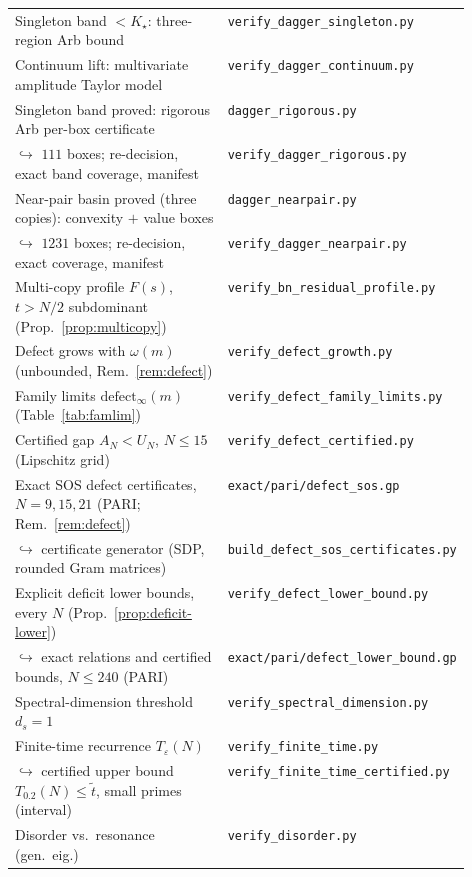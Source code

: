 \begin{longtable}{@{}p{0.53\linewidth}@{\hspace{0.6em}}l@{}}
Singleton band $<K_\star$: three-region Arb bound & \texttt{verify\_dagger\_singleton.py}\\
Continuum lift: multivariate amplitude Taylor model & \texttt{verify\_dagger\_continuum.py}\\
Singleton band proved: rigorous Arb per-box certificate & \texttt{dagger\_rigorous.py}\\
\quad$\hookrightarrow$ $111$ boxes; re-decision, exact band coverage, manifest & \texttt{verify\_dagger\_rigorous.py}\\
Near-pair basin proved (three copies): convexity $+$ value boxes & \texttt{dagger\_nearpair.py}\\
\quad$\hookrightarrow$ $1231$ boxes; re-decision, exact coverage, manifest & \texttt{verify\_dagger\_nearpair.py}\\
Multi-copy profile $F(s)$, $t>N/2$ subdominant (Prop.~\ref{prop:multicopy}) & \texttt{verify\_bn\_residual\_profile.py}\\
Defect grows with $\omega(m)$ (unbounded, Rem.~\ref{rem:defect}) & \texttt{verify\_defect\_growth.py}\\
Family limits $\mathrm{defect}_\infty(m)$ (Table~\ref{tab:famlim}) & \texttt{verify\_defect\_family\_limits.py}\\
Certified gap $A_N<U_N$, $N\le15$ (Lipschitz grid) & \texttt{verify\_defect\_certified.py}\\
Exact SOS defect certificates, $N=9,15,21$ (PARI; Rem.~\ref{rem:defect}) & \texttt{exact/pari/defect\_sos.gp}\\
\quad$\hookrightarrow$ certificate generator (SDP, rounded Gram matrices) & \texttt{build\_defect\_sos\_certificates.py}\\
Explicit deficit lower bounds, every $N$ (Prop.~\ref{prop:deficit-lower}) & \texttt{verify\_defect\_lower\_bound.py}\\
\quad$\hookrightarrow$ exact relations and certified bounds, $N\le240$ (PARI) & \texttt{exact/pari/defect\_lower\_bound.gp}\\
Spectral-dimension threshold $d_s{=}1$ & \texttt{verify\_spectral\_dimension.py}\\
Finite-time recurrence $T_\varepsilon(N)$ & \texttt{verify\_finite\_time.py}\\
\quad$\hookrightarrow$ certified upper bound $T_{0.2}(N)\le\tilde t$, small primes (interval) & \texttt{verify\_finite\_time\_certified.py}\\
Disorder vs.\ resonance (gen.\ eig.) & \texttt{verify\_disorder.py}\\

\end{longtable}

